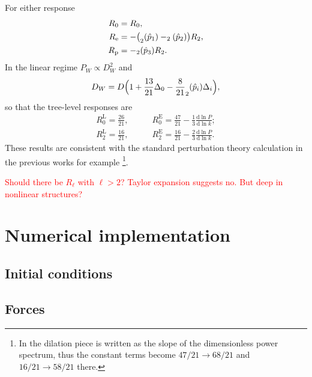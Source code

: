 \documentclass[a4paper,11pt]{article}
\let\L\relax
\DeclareMathOperator{\L}{\mathcal{L}}
\renewcommand{\d}{\mathrm{d}}
\newcommand{\Euler}{\mathrm{E}}
\newcommand{\Lagrange}{\mathrm{L}}
\newcommand{\HL}[1]{\textcolor{red}{#1}} %
\begin{document}
For either response
\begin{align}
    R_0 &= R_0, \nonumber\\
    R_\mathrm{e}
    &= - \bigl(\L_2(\hat p_1) - \L_2(\hat p_2)\bigr) R_2, \nonumber\\
    R_\mathrm{p} &= - \L_2(\hat p_3) R_2.
\end{align}
In the linear regime $P_W \propto D_W^2$ and
\begin{equation}
    D_W = D \Bigl( 1 + \frac{13}{21} \Delta_0
    - \frac8{21} \L_2(\hat p_i) \Delta_i \Bigr),
    \label{DW}
\end{equation}
so that the tree-level responses are
\begin{align}
    R^\Lagrange_0 = \frac{26}{21}, \qquad
    & R^\Euler_0 = \frac{47}{21} - \frac13 \frac{\d\ln P}{\d\ln k};
    \nonumber\\
    R^\Lagrange_2 = \frac{16}{21}, \qquad
    & R^\Euler_2 = \frac{16}{21} - \frac23 \frac{\d\ln P}{\d\ln k}.
\end{align}
These results are consistent with the standard perturbation theory calculation
in the previous works for example \cite{LiSchmittfullSeljak17}\footnote{In
\cite{LiSchmittfullSeljak17} the dilation piece is written as the slope of the
dimensionless power spectrum, thus the constant terms become $47/21 \to 68/21$
and $16/21 \to 58/21$ there.}.

\HL{Should there be $R_\ell$ with $\ell>2$? Taylor expansion suggests
no. But deep in nonlinear structures?}



\section{Numerical implementation}
\label{sec:num}



\subsection{Initial conditions}
\label{sub:ics}



\subsection{Forces}
\label{sub:treepm}
\end{document}
